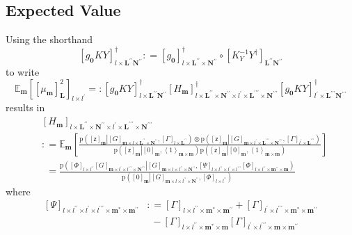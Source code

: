 \documentclass[preprint,12pt]{elsarticle}
\newcommand*{\M}[1]{\ensuremath{#1}\xspace}
\newcommand*{\x}{\times}
\newcommand*{\mi}[1]{\mathbf{#1}}
\newcommand*{\rv}[1]{\mathsf{#1}}
\newcommand*{\te}[2][]{\left\lbrack{#2}\right\rbrack_{#1}}
\newcommand*{\diag}[2][]{\left\langle{#2}\right\rangle_{#1}}
\newcommand*{\prob}[3]{\M{\mathrm{p}\!\left(\left.{#1}\right\vert{#2,#3}\right)}}
\newcommand*{\deq}{\M{\mathrel{\mathop:}=}}
\newcommand*{\deqr}{\M{=\mathrel{\mathop:}}}
\newcommand*{\ev}[3][]{\mathbb{E}_{#3}^{#1}\!\left\lbrack{#2}\right\rbrack}
\newcommand*{\evt}[3][]{\mathbb{E}_{#3}^{#1}\!#2}
\begin{document}
    \subsection{Expected Value}\label{sub:GPEst:Expectation}
    Using the shorthand
    \begin{equation*}
        \te[l\x\mi{L^{\prime\prime}}\mi{N^{\prime\prime}}]{g_{\mi{0}}KY}^{\dagger} \deq 
        \te[l\x\mi{L^{\prime\prime}}\x\mi{N^{\prime\prime}}]{g_{\mi{0}}}^{\dagger}
        \circ \te[\mi{L^{\prime\prime}}\mi{N^{\prime\prime}}]{K_{Y}^{-1} Y^{\dagger}}
    \end{equation*}
    to write
    \begin{equation*}                
        \evt{\te[l\x l^{\prime}]{\te[\mi{L}]{\mu_{\mi{m}}}^{2}}}{\mi{m}} 
        \deqr \te[l\x\mi{L^{\prime\prime}}\mi{N^{\prime\prime}}]{g_{\mi{0}}KY}^{\dagger}
        \te[l\x\mi{L^{\prime\prime}}\x\mi{N^{\prime\prime}} \x l^{\prime}\x\mi{L^{\prime\prime\prime}}\x\mi{N^{\prime\prime\prime}}]{H_{\mi{m}}}^{\dagger}
        \te[l^{\prime}\x\mi{L^{\prime\prime\prime}}\mi{N^{\prime\prime\prime}}]{g_{\mi{0}}KY}^{\dagger}
    \end{equation*}
    results in
    \begin{align*}
        &\te[l\x\mi{L^{\prime\prime}}\x\mi{N^{\prime\prime}} \x l^{\prime}\x\mi{L^{\prime\prime\prime}}\x\mi{N^{\prime\prime\prime}}]{H_{\mi{m}}} \\
        &\deq \ev{\frac{
            \prob{\te[\mi{m}]{\rv{z}}}{\te[\mi{m}\x l\x \mi{L^{\prime\prime}\x N^{\prime\prime}}]{G}}{\te[l\x \mi{L^{\prime\prime}}]{\Gamma}} \otimes
            \prob{\te[\mi{m}]{\rv{z}}}{\te[\mi{m}\x l^{\prime}\x \mi{L^{\prime\prime\prime}\x N^{\prime\prime\prime}}]{G}}{\te[l^{\prime}\x\mi{L^{\prime\prime\prime}}]{\Gamma}}}
        {\prob{\te[\mi{m}]{\rv{z}}}{\te[\mi{m}]{0}}{\diag[\mi{m\x m}]{1}}
        \prob{\te[\mi{m}]{\rv{z}}}{\te[\mi{m}]{0}}{\diag[\mi{m\x m}]{1}}}}{\mi{m}} \\
        &\phantom{:}=
        \frac{{\prob{\te[l\x l^{\prime\prime}]{\Phi}\te[\mi{m}\x l^{\prime}\x l^{\prime\prime\prime}\x\mi{N^{\prime\prime\prime}}]{G}}{\te[\mi{m}\x l\x l^{\prime\prime}\x\mi{N^{\prime\prime}}]{G}}{\te[l\x l^{\prime\prime}\x l^{\prime}\x l^{\prime\prime\prime}]{\Psi}\te[l\x l^{\prime\prime}\x \mi{m^{\prime\prime}\x m}]{\Phi}}}}
        {\prob{\te[\mi{m}]{0}}{\te[\mi{m}\x l\x l^{\prime\prime}\x\mi{N^{\prime\prime}}]{G}}
        {\te[l\x l^{\prime\prime}]{\Phi}}}
\end{align*}
    where
    \begin{equation*}
        \begin{aligned}
            \te[l\x l^{\prime\prime}\x l^{\prime}\x l^{\prime\prime\prime}\x\mi{m^{*}}\x\mi{m^{\prime\prime}}]{\Psi} &\deq 
            \te[l\x l^{\prime\prime}\x\mi{m^{*}\x m^{\prime\prime}}]{\Gamma} + \te[l^{\prime}\x l^{\prime\prime\prime}\x\mi{m^{*}\x m^{\prime\prime}}]{\Gamma} \\
            &\phantom{:}- \te[l\x l^{\prime\prime}\x\mi{m^{*}}\x\mi{m}]{\Gamma} \te[l^{\prime}\x l^{\prime\prime\prime}\x\mi{m\x m^{\prime\prime}}]{\Gamma} \\
        \end{aligned}                    
    \end{equation*}
\end{document}
